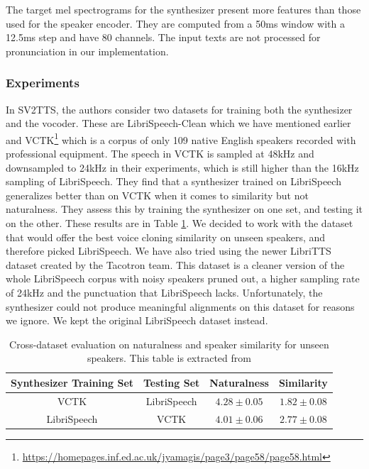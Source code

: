 \documentclass[a4paper, oneside, 12pt, english]{article}
\begin{document}
The target mel spectrograms for the synthesizer present more features than those used for the speaker encoder. They are computed from a 50ms window with a 12.5ms step and have 80 channels. The input texts are not processed for pronunciation in our implementation.

\subsubsection{Experiments}
In SV2TTS, the authors consider two datasets for training both the synthesizer and the vocoder. These are LibriSpeech-Clean which we have mentioned earlier and VCTK\footnote{\url{https://homepages.inf.ed.ac.uk/jyamagis/page3/page58/page58.html}} which is a corpus of only 109 native English speakers recorded with professional equipment. The speech in VCTK is sampled at 48kHz and downsampled to 24kHz in their experiments, which is still higher than the 16kHz sampling of LibriSpeech. They find that a synthesizer trained on LibriSpeech generalizes better than on VCTK when it comes to similarity but not naturalness. They assess this by training the synthesizer on one set, and testing it on the other. These results are in Table \ref{libri_vctk_cross}. We decided to work with the dataset that would offer the best voice cloning similarity on unseen speakers, and therefore picked LibriSpeech. We have also tried using the newer LibriTTS~\citep{LibriTTS} dataset created by the Tacotron team. This dataset is a cleaner version of the whole LibriSpeech corpus with noisy speakers pruned out, a higher sampling rate of 24kHz and the punctuation that LibriSpeech lacks. Unfortunately, the synthesizer could not produce meaningful alignments on this dataset for reasons we ignore. We kept the original LibriSpeech dataset instead.

\begin{table}[h]
	\begin{center}
		\begin{small}
			\begin{tabular}{cccc}
				\toprule
				Synthesizer Training Set & Testing Set & Naturalness & Similarity \\
				\midrule
				VCTK & LibriSpeech & $4.28 \pm 0.05$ & $1.82 \pm 0.08$ \\
				LibriSpeech & VCTK & $4.01 \pm 0.06$ & $2.77 \pm 0.08$ \\
				\bottomrule
			\end{tabular}
		\end{small}
	\end{center}
	\caption{Cross-dataset evaluation on naturalness and speaker similarity for unseen speakers. This table is extracted from \citep{SV2TTS}}
	\label{libri_vctk_cross}
\end{table}
\end{document}
